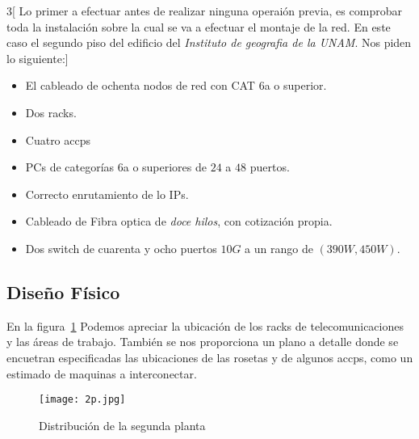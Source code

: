 \documentclass[../main.tex]{subfiles}
\begin{document}
\begin{multicols}{3}[
  Lo primer a efectuar antes de realizar ninguna operaión previa, es
  comprobar toda la instalación sobre la cual se va a efectuar el
  montaje de la red. En este caso el segundo piso del edificio del
  \textit{Instituto de geografia de la UNAM}. Nos piden lo siguiente:]

  \begin{itemize}
  \item El cableado de ochenta nodos de red con CAT 6a o superior.
  \item Dos \glspl{rack}.
  \item Cuatro \glspl{accp}
  \item \Glspl{PC} de categorías 6a o superiores de $24$ a $48$
    puertos.
  \item Correcto enrutamiento de lo IPs.
  \item Cableado de Fibra optica de \textit{doce hilos}, con cotización
    propia.
  \item Dos switch de cuarenta y ocho puertos $10G$ a un rango de
    $(390W, 450W)$.
    
  \end{itemize}
\end{multicols}

\subsection{Diseño Físico}\label{sec:disfis}

En la figura\ \ref{fig:dsp} Podemos apreciar
la ubicación de los racks de
telecomunicaciones y las áreas de trabajo.
También se nos proporciona un plano a detalle
donde se encuetran especificadas las
ubicaciones de las \glspl{roseta} y de
algunos \glspl{accp}, como un estimado de maquinas
a interconectar.

\begin{figure}[H]
  \centering
  \texttt{[image: 2p.jpg]}
  \caption{Distribución de la segunda planta}\label{fig:dsp}
\end{figure}
\end{document}
